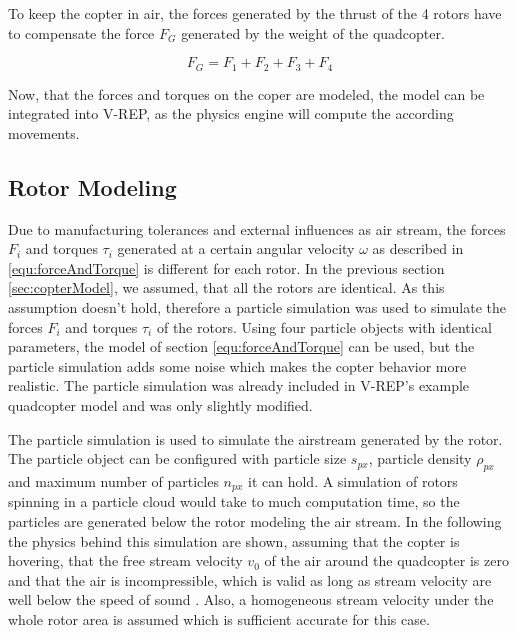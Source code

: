     To keep the copter in air, the forces generated by the thrust of the 4 rotors have to compensate the force $F_{G}$ generated by the weight of the quadcopter.
    
    \begin{equation}
    F_G = F_1 + F_2 +F_3 + F_4
    \end{equation}
    
    Now, that the forces and torques on the coper are modeled, the model can be integrated into V-REP, as the physics engine will compute the according movements.
    
    
    \subsection{Rotor Modeling}
    \label{sec:theoryRotor}
    
    Due to manufacturing tolerances and external influences as air stream, the forces $F_i$ and torques $\tau_i$ generated at a certain angular velocity $\omega$ as described in \ref{equ:forceAndTorque} is different for each rotor. 
    In the previous section \ref{sec:copterModel}, we assumed, that all the rotors are identical. 
    As this assumption doesn't hold, therefore a particle simulation was used to simulate the forces $F_i$ and torques $\tau_i$ of the rotors. 
    Using four particle objects with identical parameters, the model of section \ref{equ:forceAndTorque} can be used, but the particle simulation adds some noise which makes the copter behavior more realistic. 
    The particle simulation was already included in V-REP's example quadcopter model and was only slightly modified.
    
    The particle simulation is used to simulate the airstream generated by the rotor. 
    The particle object can be configured with  particle size $s_{px}$, particle density $\rho_{px}$ and maximum number of particles $n_{px}$ it can hold. 
    A simulation of rotors spinning in a particle cloud would take to much computation time, so the  particles are generated below the rotor modeling the air stream. 
    In the following the physics behind this simulation are shown, assuming that the copter is hovering, that the free stream velocity $v_0$ of the air around the quadcopter is zero and that the air is incompressible, which is valid as long as stream velocity are well below the speed of sound \cite{Lautrup2011PhysicsContinuous}.
     Also, a homogeneous stream velocity under the whole rotor area is assumed which is sufficient accurate for this case. 
    
